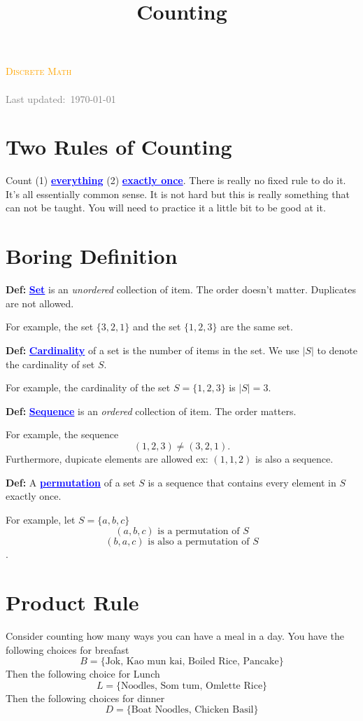 \documentclass[a4paper, 12pt]{article}
\title{Counting}
\newcommand{\definition}{\vspace{1em}\noindent\textbf{Def:} }
\newcommand{\kwd}[1]{\textcolor{blue}{\textbf{\underline{#1}}}}
\newcommand{\course}{Discrete Math}
\begin{document}
\begin{center}
	\textcolor{orange}{\textsc{\course}}\\
	\huge\textbf{\textsc{\thetitle}}\\
	\small\textcolor{gray}{Last updated:\, \today \, \currenttime}\\
\end{center}


\begin{multicols}{2}
	\section*{Two Rules of Counting}
		Count (1) \kwd{everything} (2) \kwd{exactly once}. There is really no fixed rule to do it. It's all essentially common sense. It is not hard but this is really something that can not be taught. You will need to practice it a little bit to be good at it. 

	
	\section*{Boring Definition}
	\definition \kwd{Set} is an \emph{unordered} collection of item. The order doesn't matter. Duplicates are not allowed.
	
	For example, the set $\{3,2,1\}$ and the set $\{1,2,3\}$ are the same set.
	
	\definition \kwd{Cardinality} of a set is the number of items in the set. We use $|S|$ to denote the cardinality of set $S$.
	
	For example, the cardinality of the set $S = \{1,2,3\}$ is $|S| = 3$.
	
	\definition \kwd{Sequence} is an \emph{ordered} collection of item. The order matters.
	
	For example, the sequence
	\[
		(1,2,3) \ne (3,2,1).
	\]
	Furthermore, dupicate elements are allowed ex: $(1,1,2)$ is also a sequence.
	
	\definition A \kwd{permutation} of a set $S$ is a sequence that contains every element in $S$ exactly once.
	 
	For example, let $S = \{a,b,c\}$
	\[
		(a,b,c) \text{ is a permutation of } S
	\]
	\[
		(b, a, c) \text{ is also a permutation of } S
	\].

	

	\section*{Product Rule}
	Consider counting how many ways you can have a meal in a day. You have the following choices for breafast
	\[
		B = \{\text{Jok, Kao mun kai, Boiled Rice, Pancake}\}
	\]
	Then the following choice for Lunch
	\[
		L = \{\text{Noodles, Som tum, Omlette Rice}\}
	\]
	Then the following choices for dinner
	\[
		D = \{\text{Boat Noodles, Chicken Basil} \}
	\]
	

\end{multicols}
\end{document}
